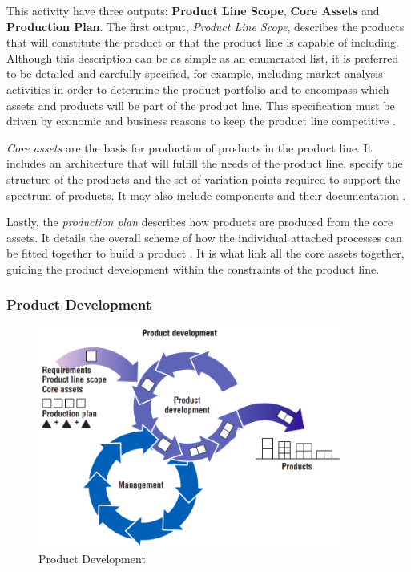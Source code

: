 This activity have three outputs: \textbf{Product Line Scope}, \textbf{Core Assets} and \textbf{Production Plan}. The first output, \textit{Product Line Scope}, describes the products that will constitute the product or that the product line is capable of including. Although this description can be as simple as an enumerated list, it is preferred to be detailed and carefully specified, for example, including market analysis activities in order to determine the product portfolio and to encompass which assets and products will be part of the product line. This specification must be driven by economic and business reasons to keep the product line competitive \citep{rafael2013systems}.

\textit{Core assets} are the basis for production of products in the product line. It includes an architecture that will fulfill the needs of the product line, specify the structure of the products and the set of variation points required to support the spectrum of products. It may also include components and their documentation \citep{clements2002software}.

Lastly, the \textit{production plan} describes how products are produced from the core assets. It details the overall scheme of how the individual attached processes can be fitted together to build a product \citep{clements2002software}. It is what link all the core assets together, guiding the product development within the constraints of the product line.




\subsubsection{Product Development}

\begin{figure}[htp]
\begin{center}
  \includegraphics[width=10cm]{chapters/background/img/SPLproduct-development.png}
  \caption[Product Development]{Product Development \citep{clements2002software}}
  \label{fg:spl-productdev}
\end{center}
\end{figure}


